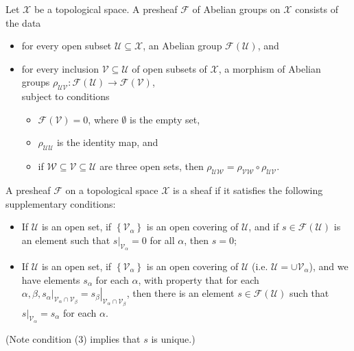 \documentclass{beamer}
\theoremstyle{plain}
\newcommand{\al}{\alpha}
\newcommand{\sU}{\mathcal{U}}       %
\newcommand{\sV}{\mathcal{V}}       %
\newcommand{\sX}{\mathcal{X}}       %
\renewcommand{\a}{\alpha}
\newcommand{\bt}{\beta}           %
\begin{document}
\begin{frame}
	\begin{definition}\label{presheaf_defn}
		Let $\sX$ be a topological space. A \alert{presheaf} $\mathscr F$ of Abelian groups on  $\sX$ consists of the data
		\begin{itemize}
			\item[(a)] for every open subset $\sU \subseteq \sX$, an Abelian group $\mathscr F\left(\sU\right)$, and 
			\item[(b)] for every inclusion $\sV \subseteq \sU$ of open subsets of $\sX$, a morphism of Abelian groups $\rho_{\sU \sV}:\mathscr F\left(\sU\right) \to \mathscr F\left(\sV\right)$,\\
			subject to conditions
			\begin{itemize}
				\item [(0)] $\mathscr F\left(\sV\right)= 0$, where $\emptyset$ is the empty set,
				\item[(1)] $\rho_{\sU \sU}$ is the identity map, and
				\item[(2)] if $\mathcal W \subseteq \sV \subseteq \sU$ are three open sets, then $\rho_{\sU \mathcal W} = \rho_{\sV \mathcal W }\circ \rho_{\sU \sV}$.
			\end{itemize}
		\end{itemize}
	\end{definition}
\end{frame}
\begin{frame}
	
	\begin{definition}\label{sheaf_defn}
		A {presheaf} $\mathscr F$ on  
		a topological space $\sX$ is a \alert{sheaf}  if it satisfies the following supplementary conditions:
		\begin{itemize}
			\item[(3)] If $\sU$ is an open set, if $\left\{\sV_{\a}\right\}$ is an open covering of $\sU$, and if $s \in \mathscr F\left(\sU\right)$ is an element such that $\left.s\right|_{\sV_{\a}}= 0$ for all $\a$, then $s = 0$;
			\item[(4)] If $\sU$ is an open set, if $\left\{\sV_{\a}\right\}$ is an open covering of $\sU$ (i.e. $\sU = \cup\sV_\a$), and we have elements $s_\a$ for each $\a$, with property that for each $\al, \bt, \left.s_\a\right|_{\sV_{\a}\cap \sV_{\bt}}= \left.s_\bt\right|_{\sV_{\a}\cap \sV_{\bt}}$, then there is an element $s \in \mathscr F\left(\sU\right)$ such that $\left.s\right|_{\sV_\a} = s_\a$ for each $\a$.
		\end{itemize}
		(Note condition (3) implies that $s$ is unique.)
	\end{definition}
\end{frame}
\end{document}
